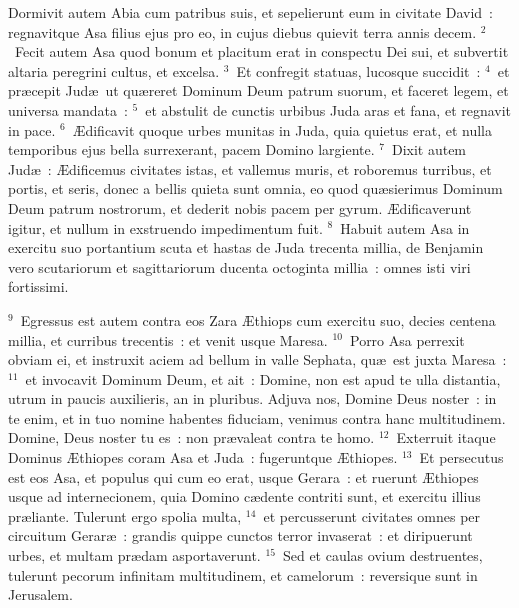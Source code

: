 \lettrine[lines=10,image=true,loversize=0.05,lraise=-0.03]{D}{}ormivit autem Abia cum patribus suis, et sepelierunt eum in civitate David~: regnavitque Asa filius ejus pro eo, in cujus diebus quievit terra annis decem.
${}^{2}$~Fecit autem Asa quod bonum et placitum erat in conspectu Dei sui, et subvertit altaria peregrini cultus, et excelsa.
${}^{3}$~Et confregit statuas, lucosque succidit~:
${}^{4}$~et pr\ae cepit Jud\ae\ ut qu\ae reret Dominum Deum patrum suorum, et faceret legem, et universa mandata~:
${}^{5}$~et abstulit de cunctis urbibus Juda aras et fana, et regnavit in pace.
${}^{6}$~\AE dificavit quoque urbes munitas in Juda, quia quietus erat, et nulla temporibus ejus bella surrexerant, pacem Domino largiente.
${}^{7}$~Dixit autem Jud\ae~: \AE dificemus civitates istas, et vallemus muris, et roboremus turribus, et portis, et seris, donec a bellis quieta sunt omnia, eo quod qu\ae sierimus Dominum Deum patrum nostrorum, et dederit nobis pacem per gyrum. \AE dificaverunt igitur, et nullum in exstruendo impedimentum fuit.
${}^{8}$~Habuit autem Asa in exercitu suo portantium scuta et hastas de Juda trecenta millia, de Benjamin vero scutariorum et sagittariorum ducenta octoginta millia~: omnes isti viri fortissimi.


${}^{9}$~Egressus est autem contra eos Zara \AE thiops cum exercitu suo, decies centena millia, et curribus trecentis~: et venit usque Maresa.
${}^{10}$~Porro Asa perrexit obviam ei, et instruxit aciem ad bellum in valle Sephata, qu\ae\ est juxta Maresa~:
${}^{11}$~et invocavit Dominum Deum, et ait~: Domine, non est apud te ulla distantia, utrum in paucis auxilieris, an in pluribus. Adjuva nos, Domine Deus noster~: in te enim, et in tuo nomine habentes fiduciam, venimus contra hanc multitudinem. Domine, Deus noster tu es~: non pr\ae valeat contra te homo.
${}^{12}$~Exterruit itaque Dominus \AE thiopes coram Asa et Juda~: fugeruntque \AE thiopes.
${}^{13}$~Et persecutus est eos Asa, et populus qui cum eo erat, usque Gerara~: et ruerunt \AE thiopes usque ad internecionem, quia Domino c\ae dente contriti sunt, et exercitu illius pr\ae liante. Tulerunt ergo spolia multa,
${}^{14}$~et percusserunt civitates omnes per circuitum Gerar\ae~: grandis quippe cunctos terror invaserat~: et diripuerunt urbes, et multam pr\ae dam asportaverunt.
${}^{15}$~Sed et caulas ovium destruentes, tulerunt pecorum infinitam multitudinem, et camelorum~: reversique sunt in Jerusalem.

